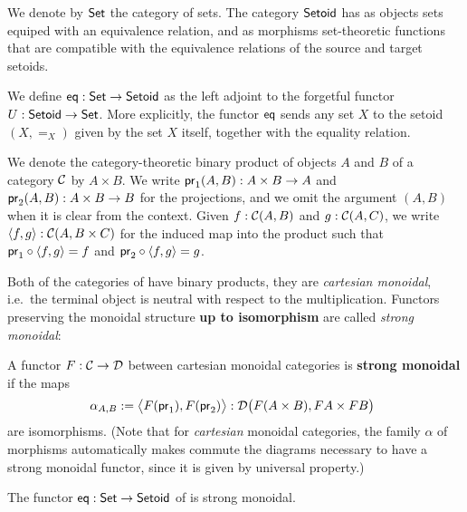 \documentclass{amsart}
\newcommand{\fat}[1]{\textbf{#1}}
\begin{document}
\begin{definition}\label{def:set_setoid}
 We denote by $\Set$ the category of sets. The category $\Setoid$ has as objects sets equiped with an equivalence relation,
 and as morphisms set-theoretic functions that are compatible with the equivalence relations of the source and target setoids.
\end{definition}



\begin{definition}\label{def:eq}
 We define $\eq : \Set\to\Setoid$ as the left adjoint to the forgetful functor 
  $U : \Setoid \to \Set$.
  More explicitly, the functor $\eq$ sends any set $X$ to the setoid $(X,=_X)$ given by the set $X$ itself, together
  with the equality relation.
\end{definition}


\begin{remark}
  We denote the category-theoretic binary product of objects $A$ and $B$ of a category $\C$ by $A\times B$.
  We write $\pr_1(A,B) : A\times B \to A$ and $\pr_2(A,B) : A\times B \to B$ for the projections, and we omit the 
  argument $(A,B)$ when it is clear from the context.
  Given $f : \C(A, B)$ and $g : \C(A,C)$, we write $\langle f,g\rangle : \C(A,B\times C)$ for the induced map into the product such that
  $\comp{\langle f,g\rangle}{\pr_1} = f$ and $\comp{\langle f,g\rangle}{\pr_2} = g$.
\end{remark}

Both of the categories of  have binary products, they are \emph{cartesian monoidal}, i.e.\ the terminal 
object is neutral with respect to the multiplication. Functors preserving the monoidal structure \textbf{up to isomorphism}
are called \emph{strong monoidal}:

\begin{definition}\label{def:monoidal_functor}
 A functor $F:\C\to\D$ between cartesian monoidal categories is \fat{strong monoidal} if the maps
 \[ \alpha_{A,B} := \bigl\langle F(\pr_1), F(\pr_2) \bigr\rangle : \D\bigl(F(A\times B), FA\times FB\bigr)\enspace  \] 
 are isomorphisms.
 (Note that for \emph{cartesian} monoidal categories, the family $\alpha$ of morphisms automatically makes commute the 
  diagrams necessary to have a strong monoidal functor, since it is given by universal property.)
\end{definition}

\begin{example}
  The functor $\eq: \Set \to \Setoid$ of  is strong monoidal.
\end{example}
\end{document}
